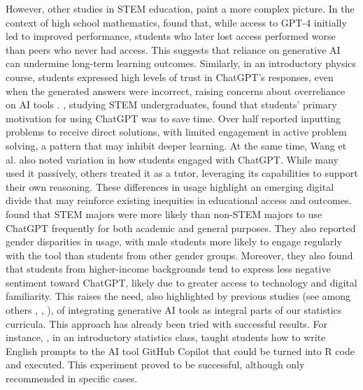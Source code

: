 \documentclass[
  12pt]{article}
\begin{document}
However, other studies in STEM education, paint a more complex picture. 
In the context of high school mathematics, \cite{bastani-et-al-2024} found that, while access to GPT-4 initially led to improved performance, students who later lost access performed worse than peers who never had access.  
This suggests that reliance on generative AI can undermine long-term learning outcomes. 
Similarly, in an introductory physics course, students expressed high levels of trust in ChatGPT's responses, even when the generated answers were incorrect, raising concerns about overreliance on AI tools \citep{ding-et-al-2023}. 
\cite{wang-et-al-2025}, studying STEM undergraduates, found that students' primary motivation for using ChatGPT was to save time. 
Over half reported inputting problems to receive direct solutions, with limited engagement in active problem solving, a pattern that may inhibit deeper learning. At the same time, Wang et al. also noted variation in how students engaged with ChatGPT. 
While many used it passively, others treated it as a tutor, leveraging its capabilities to support their own reasoning. 
These differences in usage highlight an emerging digital divide that may reinforce existing inequities in educational access and outcomes. 
\cite{baek-et-al-2024} found that STEM majors were more likely than non-STEM majors to use ChatGPT frequently for both academic and general purposes. 
They also reported gender disparities in usage, with male students more likely to engage regularly with the tool than students from other gender groups. 
Moreover, they also found that students from higher-income backgrounds tend to express less negative sentiment toward ChatGPT, likely due to greater access to technology and digital familiarity. 
This raises the need, also highlighted by previous studies (see among others \cite{wang-et-al-2025}, \cite{hariyanti-et-al-2025}, \cite{bien-mukherjee-2025}), of integrating generative AI tools as integral parts of our statistics curricula. This approach has already been tried with successful results. For instance, \cite{bien-mukherjee-2025}, in an introductory statistics class, taught students how to write English prompts to the AI tool GitHub Copilot that could be turned into R code and executed. This experiment proved to be successful, although only recommended in specific cases.
\end{document}
